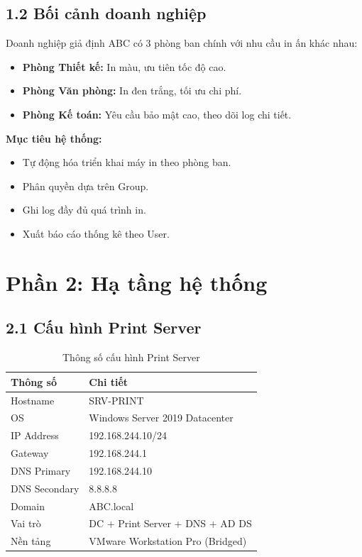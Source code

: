 \subsection*{1.2 Bối cảnh doanh nghiệp}

Doanh nghiệp giả định ABC có 3 phòng ban chính với nhu cầu in ấn khác nhau:

\begin{itemize}
    \item \textbf{Phòng Thiết kế:} In màu, ưu tiên tốc độ cao.
    \item \textbf{Phòng Văn phòng:} In đen trắng, tối ưu chi phí.
    \item \textbf{Phòng Kế toán:} Yêu cầu bảo mật cao, theo dõi log chi tiết.
\end{itemize}

\textbf{Mục tiêu hệ thống:}
\begin{itemize}
    \item Tự động hóa triển khai máy in theo phòng ban.
    \item Phân quyền dựa trên Group.
    \item Ghi log đầy đủ quá trình in.
    \item Xuất báo cáo thống kê theo User.
\end{itemize}


\section*{Phần 2: Hạ tầng hệ thống}

\subsection*{2.1 Cấu hình Print Server}

\begin{table}[h]
\centering
\begin{tabular}{|l|p{11cm}|}
\hline
\textbf{Thông số} & \textbf{Chi tiết} \\
\hline
Hostname & SRV-PRINT \\
\hline
OS & Windows Server 2019 Datacenter \\
\hline
IP Address & 192.168.244.10/24 \\
\hline
Gateway & 192.168.244.1 \\
\hline
DNS Primary & 192.168.244.10 \\
\hline
DNS Secondary & 8.8.8.8 \\
\hline
Domain & ABC.local \\
\hline
Vai trò & DC + Print Server + DNS + AD DS \\
\hline
Nền tảng & VMware Workstation Pro (Bridged) \\
\hline
\end{tabular}
\caption{Thông số cấu hình Print Server}
\label{tab:print_server_config}
\end{table}


